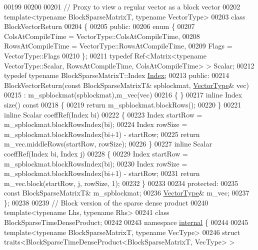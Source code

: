 \begin{DoxyCode}
00199 
00200 
00201 \textcolor{comment}{// Proxy to view a regular vector as a block vector}
00202 \textcolor{keyword}{template}<\textcolor{keyword}{typename} BlockSparseMatrixT, \textcolor{keyword}{typename} VectorType>
00203 \textcolor{keyword}{class }BlockVectorReturn
00204 \{
00205   \textcolor{keyword}{public}:
00206     \textcolor{keyword}{enum} \{
00207       ColsAtCompileTime = VectorType::ColsAtCompileTime,
00208       RowsAtCompileTime = VectorType::RowsAtCompileTime,
00209       Flags = VectorType::Flags
00210     \};
00211     \textcolor{keyword}{typedef} Ref<Matrix<typename VectorType::Scalar, RowsAtCompileTime, ColsAtCompileTime> > Scalar;
00212     \textcolor{keyword}{typedef} \textcolor{keyword}{typename} BlockSparseMatrixT::Index \hyperlink{namespace_eigen_a62e77e0933482dafde8fe197d9a2cfde}{Index};
00213   \textcolor{keyword}{public}:
00214     BlockVectorReturn(\textcolor{keyword}{const} BlockSparseMatrixT& spblockmat, \hyperlink{struct_vector_type}{VectorType}& vec)
00215     : m\_spblockmat(spblockmat),m\_vec(vec)
00216     \{ \}
00217     \textcolor{keyword}{inline} Index size()\textcolor{keyword}{ const}
00218 \textcolor{keyword}{    }\{
00219       \textcolor{keywordflow}{return} m\_spblockmat.blockRows();
00220     \}
00221     \textcolor{keyword}{inline} Scalar coeffRef(Index bi)
00222     \{
00223       Index startRow = m\_spblockmat.blockRowsIndex(bi);
00224       Index rowSize = m\_spblockmat.blockRowsIndex(bi+1) - startRow;
00225       \textcolor{keywordflow}{return} m\_vec.middleRows(startRow, rowSize);
00226     \}
00227     \textcolor{keyword}{inline} Scalar coeffRef(Index bi, Index j)
00228     \{
00229       Index startRow = m\_spblockmat.blockRowsIndex(bi);
00230       Index rowSize = m\_spblockmat.blockRowsIndex(bi+1) - startRow;
00231       \textcolor{keywordflow}{return} m\_vec.block(startRow, j, rowSize, 1);
00232     \}
00233 
00234   \textcolor{keyword}{protected}:
00235     \textcolor{keyword}{const} BlockSparseMatrixT& m\_spblockmat;
00236     \hyperlink{struct_vector_type}{VectorType}& m\_vec;
00237 \};
00238 
00239 \textcolor{comment}{// Block version of the sparse dense product}
00240 \textcolor{keyword}{template}<\textcolor{keyword}{typename} Lhs, \textcolor{keyword}{typename} Rhs>
00241 \textcolor{keyword}{class }BlockSparseTimeDenseProduct;
00242 
00243 \textcolor{keyword}{namespace }\hyperlink{namespaceinternal}{internal} \{
00244 
00245 \textcolor{keyword}{template}<\textcolor{keyword}{typename} BlockSparseMatrixT, \textcolor{keyword}{typename} VecType>
00246 \textcolor{keyword}{struct }traits<BlockSparseTimeDenseProduct<BlockSparseMatrixT, VecType> >

\end{DoxyCode}
